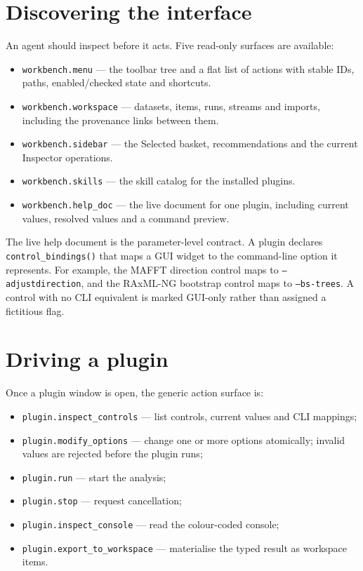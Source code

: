 \documentclass[10pt]{report}
\begin{document}
\section{Discovering the interface}

An agent should inspect before it acts. Five read-only surfaces are available:

\begin{itemize}
  \item \texttt{workbench.menu} --- the toolbar tree and a flat list of actions
        with stable IDs, paths, enabled/checked state and shortcuts.
  \item \texttt{workbench.workspace} --- datasets, items, runs, streams and
        imports, including the provenance links between them.
  \item \texttt{workbench.sidebar} --- the Selected basket, recommendations
        and the current Inspector operations.
  \item \texttt{workbench.skills} --- the skill catalog for the installed
        plugins.
  \item \texttt{workbench.help\_doc} --- the live document for one plugin,
        including current values, resolved values and a command preview.
\end{itemize}

The live help document is the parameter-level contract. A plugin declares
\texttt{control\_bindings()} that maps a GUI widget to the command-line option
it represents. For example, the MAFFT direction control maps to
\texttt{--adjustdirection}, and the RAxML-NG bootstrap control maps to
\texttt{--bs-trees}. A control with no CLI equivalent is marked GUI-only rather
than assigned a fictitious flag.

\section{Driving a plugin}

Once a plugin window is open, the generic action surface is:

\begin{itemize}
  \item \texttt{plugin.inspect\_controls} --- list controls, current values and
        CLI mappings;
  \item \texttt{plugin.modify\_options} --- change one or more options
        atomically; invalid values are rejected before the plugin runs;
  \item \texttt{plugin.run} --- start the analysis;
  \item \texttt{plugin.stop} --- request cancellation;
  \item \texttt{plugin.inspect\_console} --- read the colour-coded console;
  \item \texttt{plugin.export\_to\_workspace} --- materialise the typed result
        as workspace items.
\end{itemize}
\end{document}
